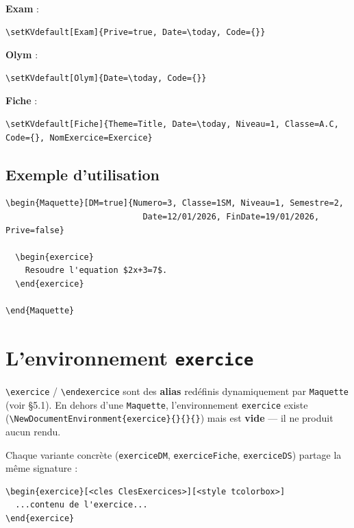 \documentclass[11pt,a4paper]{article}
\newcommand{\cmdname}[1]{\texttt{\textbackslash#1}}
\begin{document}
\textbf{Exam} :
\begin{lstlisting}
\setKVdefault[Exam]{Prive=true, Date=\today, Code={}}
\end{lstlisting}

\textbf{Olym} :
\begin{lstlisting}
\setKVdefault[Olym]{Date=\today, Code={}}
\end{lstlisting}

\textbf{Fiche} :
\begin{lstlisting}
\setKVdefault[Fiche]{Theme=Title, Date=\today, Niveau=1, Classe=A.C, Code={}, NomExercice=Exercice}
\end{lstlisting}

\subsection{Exemple d'utilisation}

\begin{lstlisting}
\begin{Maquette}[DM=true]{Numero=3, Classe=1SM, Niveau=1, Semestre=2,
                            Date=12/01/2026, FinDate=19/01/2026, Prive=false}

  \begin{exercice}
    Resoudre l'equation $2x+3=7$.
  \end{exercice}

\end{Maquette}
\end{lstlisting}

\section{L'environnement \texttt{exercice}}
\label{sec:exercice}

\cmdname{exercice} / \cmdname{endexercice} sont des \textbf{alias} redéfinis dynamiquement par \texttt{Maquette} (voir \S5.1). En dehors d'une \texttt{Maquette}, l'environnement \texttt{exercice} existe (\cmdname{NewDocumentEnvironment\{exercice\}\{\}\{\}\{\}}) mais est \textbf{vide} — il ne produit aucun rendu.

Chaque variante concrète (\texttt{exerciceDM}, \texttt{exerciceFiche}, \texttt{exerciceDS}) partage la même signature :

\begin{lstlisting}
\begin{exercice}[<cles ClesExercices>][<style tcolorbox>]
  ...contenu de l'exercice...
\end{exercice}
\end{lstlisting}
\end{document}
